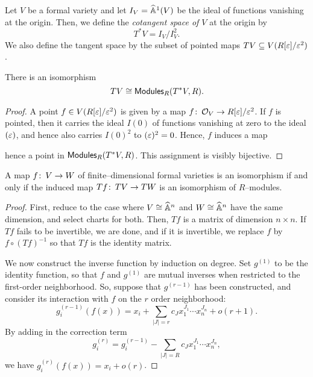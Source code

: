 \begin{definition}
Let $V$ be a formal variety and let $I_V = \widehat{\mathbb{A}}^1(V)$ be the ideal of functions vanishing at the origin.  Then, we define the \textit{cotangent space of $V$} at the origin by \[T^* V = I_V / I_V^2.\]  We also define the tangent space by the subset of pointed maps $TV \subseteq V(R[\varepsilon] / \varepsilon^2)$.
\end{definition}

\begin{lemma}
There is an isomorphism \[TV \cong \mathsf{Modules}_R(T^* V, R).\]
\end{lemma}
\begin{proof}
A point $f \in V(R[\varepsilon] / \varepsilon^2)$ is given by a map $f\colon\thinspace \mathcal{O}_V \to R[\varepsilon] / \varepsilon^2$.  If $f$ is pointed, then it carries the ideal $I(0)$ of functions vanishing at zero to the ideal $(\varepsilon)$, and hence also carries $I(0)^2$ to $(\varepsilon)^2 = 0$.  Hence, $f$ induces a map
\begin{center}
\end{center}
hence a point in $\mathsf{Modules}_R(T^* V, R)$.  This assignment is visibly bijective.
\end{proof}

\begin{theorem}\label{InverseFunctionTheoremForFVars}
A map $f\colon\thinspace V \to W$ of finite--dimensional formal varieties is an isomorphism if and only if the induced map $Tf\colon\thinspace TV \to TW$ is an isomorphism of $R$--modules.
\end{theorem}
\begin{proof}
First, reduce to the case where $V \cong \widehat{\mathbb{A}}^n$ and $W \cong \widehat{\mathbb{A}}^n$ have the same dimension, and select charts for both.  Then, $Tf$ is a matrix of dimension $n \times n$.  If $Tf$ fails to be invertible, we are done, and if it is invertible, we replace $f$ by $f \circ (Tf)^{-1}$ so that $Tf$ is the identity matrix.

We now construct the inverse function by induction on degree.  Set $g^{(1)}$ to be the identity function, so that $f$ and $g^{(1)}$ are mutual inverses when restricted to the first-order neighborhood.  So, suppose that $g^{(r-1)}$ has been constructed, and consider its interaction with $f$ on the $r${\th} order neighborhood: \[g_i^{(r-1)}(f(x)) = x_i + \sum_{|J| = r} c_J x_1^{J_1} \cdots x_n^{J_n} + o(r+1). \]  By adding in the correction term \[g_i^{(r)} = g_i^{(r-1)} - \sum_{|J| = R} c_J x_1^{J_1} \cdots x_n^{J_n},\] we have $g_i^{(r)}(f(x)) = x_i + o(r)$.
\end{proof}

